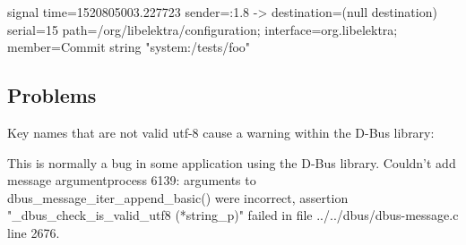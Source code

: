 \begin{DoxyCode}
signal time=1520805003.227723 sender=:1.8 -> destination=(null destination) serial=15
       path=/org/libelektra/configuration; interface=org.libelektra; member=Commit
   string "system:/tests/foo"
\end{DoxyCode}
\hypertarget{autotoc_md151_autotoc_md162}{}\subsection{Problems}\label{autotoc_md151_autotoc_md162}
Key names that are not valid utf-\/8 cause a warning within the D-\/\+Bus library\+:


\begin{DoxyCode}
This is normally a bug in some application using the D-Bus library.
Couldn't add message argumentprocess 6139: arguments to dbus\_message\_iter\_append\_basic() were incorrect,
       assertion "\_dbus\_check\_is\_valid\_utf8 (*string\_p)" failed in file ../../dbus/dbus-message.c line 2676.
\end{DoxyCode}
 